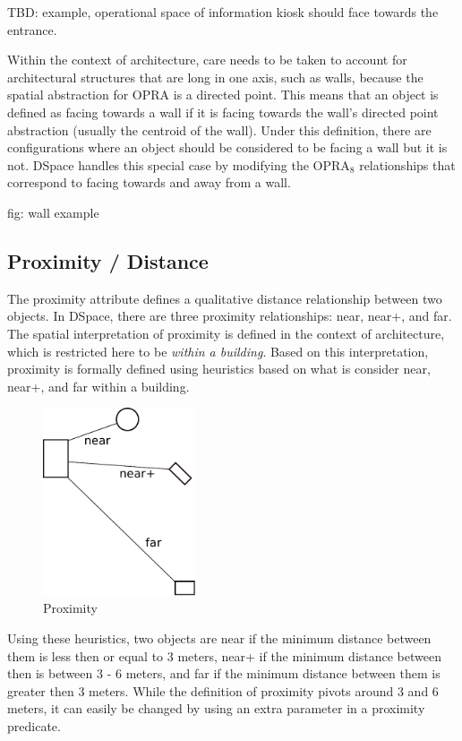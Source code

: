 \documentclass[12pt]{ucthesis}
\begin{document}
TBD: example, operational space of information kiosk should face towards the entrance.

Within the context of architecture, care needs to be taken to account for architectural structures that are long in one axis, such as walls, because the spatial abstraction for OPRA is a directed point. This means that an object is defined as facing towards a wall if it is facing towards the wall's directed point abstraction (usually the centroid of the wall). Under this definition, there are configurations where an object should be considered to be facing a wall but it is not. DSpace handles this special case by modifying the OPRA$_{8}$ relationships that correspond to facing towards and away from a wall. 

fig: wall example

\subsection{Proximity / Distance}
The proximity attribute defines a qualitative distance relationship between two objects. In DSpace, there are three proximity relationships: near, near+, and far. The spatial interpretation of proximity is defined in the context of architecture, which is restricted here to be \emph{within a building}. Based on this interpretation, proximity is formally defined using heuristics based on what is consider near, near+, and far within a building.   


\begin{figure}[H]
\centering
\includegraphics[width=45mm]{proximity}
\caption{Proximity}
\label{proximity}
\end{figure}

Using these heuristics, two objects are near if the minimum distance between them is less then or equal to 3 meters, near+ if the minimum distance between then is between 3 - 6 meters, and far if the minimum distance between them is greater then 3 meters. While the definition of proximity pivots around 3 and 6 meters, it can easily be changed by using an extra parameter in a proximity predicate. 
\end{document}
